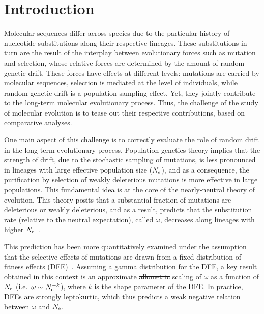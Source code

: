\documentclass[authoryear]{elsarticle} %
\providecommand{\DIFdeltex}[1]{{\protect\color{red}\sout{#1}}}                      %
\providecommand{\DIFdelbegin}{} %
\providecommand{\DIFdelend}{} %
\providecommand{\DIFdel}[1]{\texorpdfstring{\DIFdeltex{#1}}{}} %
\begin{document}
\section{Introduction}
Molecular sequences differ across species due to the particular history of nucleotide {substitutions} along their respective lineages.
These {substitutions} in turn are the result of the interplay between evolutionary forces such as mutation and selection, whose relative forces are determined by the amount of random {genetic drift}.
These forces have effects at different levels: mutations are carried by molecular sequences, selection is mediated at the level of individuals, while random {genetic drift} is a population sampling effect.
Yet, they jointly contribute to the long-term molecular evolutionary process.
Thus, the challenge of the study of molecular evolution is to tease out their respective contributions, based on comparative analyses.

One main aspect of this challenge is to correctly evaluate the role of random drift in the long term evolutionary process.
Population genetics theory implies that the strength of drift, due to the stochastic sampling of mutations, is less pronounced in lineages with large {effective population size} ($N_{\text{e}}$), and as a consequence, the purification by selection of weakly deleterious mutations is more effective in large populations.
This fundamental idea is at the core of the {nearly-neutral} theory of evolution.
This theory posits that a substantial fraction of mutations are deleterious or weakly deleterious, and as a result, predicts that the {substitution} rate (relative to the {neutral} expectation), called $\omega$, decreases along lineages with higher $N_{\text{e}}$~\citep{Ohta1972, Ohta1992}.

This prediction has been more quantitatively examined under the assumption that the selective effects of mutations are drawn from a fixed distribution of fitness effects ({DFE})~\citep{Kimura1979, Welch2008}.
Assuming a gamma distribution for the {DFE}, a key result obtained in this context is an approximate \DIFdelbegin \DIFdel{allometric }\DIFdelend scaling of $\omega$ as a function of $N_{\text{e}}$ (i.e.~$\omega \sim N_{\text{e}}^{-k}$), where $k$ is the shape parameter of the {DFE}.
In practice, DFEs are strongly leptokurtic, which thus predicts a weak negative relation between $\omega$ and $N_{\text{e}}$.
\end{document}

